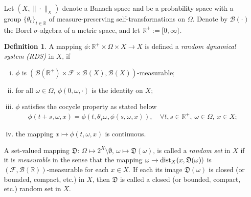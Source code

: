 \documentclass{elsarticle}
\newtheorem{lemma}[theorem]{Lemma}
\theoremstyle{definition}
\newtheorem{definition}[theorem]{Definition}
\numberwithin{equation}{section}
\newcommand{\dist}{{\rm dist}}
\newcommand{\R}{\mathbb{R}}
\begin{document}
Let $(X,\|\cdot\|_X)$ denote a Banach space  and   be  a probability space with a group $\{\theta_t\}_{t\in\mathbb{R}}$ of measure-preserving self-transformations on $\Omega$.
Denote by $\mathcal{B}(\cdot)$ the Borel $\sigma$-algebra of a metric space, and let
   $\R^+:=[0,\infty)$.

\begin{definition}
A mapping $\phi:\mathbb{R}^+\times\Omega\times X\rightarrow X$ is defined  a {\em random dynamical system (RDS)}   in $X$, if
\begin{enumerate}[(i)]
\item $\phi$ is $(\mathcal{B}(\mathbb{R}^+)\times\mathcal{F}\times\mathcal{B}(X),\mathcal{B}(X))$-measurable;

\item  for all $\omega\in\Omega$, $\phi(0,\omega,\cdot)$ is the identity on $X$;

\item $\phi$ satisfies  the cocycle property as  stated below
\begin{align*}
\phi(t+s,\omega,x)=\phi(t,\theta_s\omega,\phi(s,\omega,x)), \quad \forall t,s\in \mathbb{R}^+,~\omega\in\Omega,~x\in X;
\end{align*}
\item the mapping $x\mapsto \phi(t,\omega, x)$ is continuous.
\end{enumerate}
\end{definition}


A  set-valued mapping $\mathfrak D$: $\Omega\mapsto 2^X\setminus \emptyset $, $ \omega\mapsto \mathfrak D(\omega) $, is called a \emph{random set}  in $X$ if it is   \emph{measurable} in the sense that the mapping $\omega\to \dist_X(x, \mathfrak D(\omega))$    is  $(\mathcal F,\mathcal B(\R))$-measurable for each $x\in X$. If each its image $\mathfrak D(\omega)$ is closed (or  bounded, compact, etc.) in $X$, then $\mathfrak D$ is called a  closed (or  bounded, compact, etc.) random set in $X$.

\end{document}
